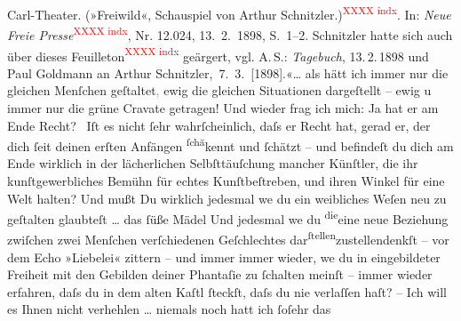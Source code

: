 \begin{ledgroupsized}[t]{13cm}
{{{{                        Carl-Theater. (»Freiwild«, Schauspiel von Arthur Schnitzler.)}\textcolor{red}{\textsuperscript{XXXX indx}}. In: \emph{Neue Freie Presse}\textcolor{red}{\textsuperscript{XXXX indx}}, Nr. 12.024, 13. 2. 1898, S. 1–2. Schnitzler hatte sich auch über dieses Feuilleton\textcolor{red}{\textsuperscript{XXXX indx}} geärgert, vgl. A. S.: \emph{Tagebuch}, 13. 2. 1898 und Paul Goldmann an Arthur Schnitzler, 7. 3. [1898].}}}\label{K_L02988-55h}«{\dots}
               als hätt ich immer nur die gleichen Menſchen geſtaltet\textcolor{gray}{,}{ }{\pb}ewig die gleichen Situationen dargeſtellt –
               ewig u immer nur die grüne Cravate getragen! Und wieder frag ich mich: Ja hat er am
               Ende Recht? {\dotstwo} Iſt es nicht ſehr wahrſcheinlich, daſs er
               Recht hat, gerad er, der dich ſeit deinen erſten Anfängen \substVorne{}\textsuperscript{ſchä}\substDazwischen{}ke\substHinten{}nnt und ſchätzt – und befindeſt du dich am Ende wirklich in der lächerlichen
               Selbſttäuſchung mancher {\pb}Künſtler, die ihr
               kunſtgewerbliches Bemühn für echtes Kunſtbeſtreben, und ihren Winkel für eine Welt
               halten? Und mußt Du wirklich jedesmal we{\geminationn} du ein
               weibliches Weſen neu zu geſtalten glaubteſt \label{T_L02988-4v}\label{T_L02988-4h}{ }{\dots} das ſüße Mädel {\dotstwo} Und jedesmal
                  we{\geminationn} du \substVorne{}\textsuperscript{die}\substDazwischen{}eine neue\substHinten{} Beziehung zwiſchen zwei Menſchen verſchiedenen Geſchlechtes dar\substVorne{}\textsuperscript{ſtellen}{\allowbreak}\substDazwischen{}zustellen\substHinten{}{ }{\pb}denkſt – vor dem Echo »Liebelei« zittern – und immer immer wieder, we{\geminationn} du in eingebildeter Freiheit mit den Gebilden deiner
               Phantaſie zu ſchalten meinſt – immer wieder erfahren, daſs du in dem alten Kaſtl
               ſteckſt, daſs du nie verlaſſen haſt? – Ich will es Ihnen nicht verhehlen {\dots} niemals noch hatt ich ſoſehr das

\end{ledgroupsized}
